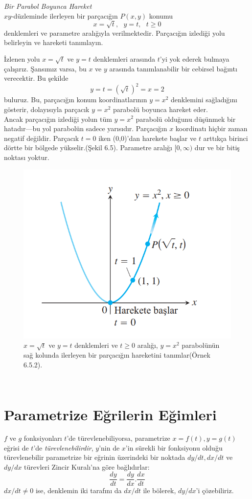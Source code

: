 \begin{ornek}\textit{Bir Parabol Boyunca Hareket}\\
$xy$-düzleminde ilerleyen bir parçacığın $P(x,y)$ konumu 
	\begin{equation*}
	x=\sqrt{t},\textit{       		}	y=t,	\textit{       		} t\geq0
	\end{equation*}
denklemleri ve parametre aralığıyla verilmektedir. Parçacığın izlediği yolu belirleyin ve hareketi tanımlayın.
\end{ornek}
\begin{cozum} İzlenen yolu $x =\sqrt{t}$ ve $y=t$ denklemleri arasında $t$'yi yok ederek bulmaya çalışırız. Şansımız varsa, bu $x$ ve $y$ arasında tanımlanabilir bir cebirsel bağıntı verecektir. Bu şekilde
	\begin{equation*}
	y=t=(\sqrt{t})^2=x=2
	\end{equation*}
buluruz. Bu, parçacığın konum koordinatlarının $y=x^2$ denklemini sağladığını gösterir, dolayısıyla parçacık $y=x^2$ parabolü boyunca hareket eder.\\
	Ancak parçacığın izlediği yolun tüm $y=x^2$ parabolü olduğunu düşünmek bir hatadır---bu yol parabolün sadece yarısıdır. Parçacığın $x$ koordinatı hiçbir zaman negatif değildir. Parçacık $t=0$ iken (0,0)'dan harekete başlar ve $t$ arttıkça birinci dörtte bir bölgede yükselir.(Şekil 6.5). Parametre aralığı $[0,\infty)$ dur ve bir bitiş noktası yoktur.
\begin{figure}[H]
	\centering
	\includegraphics[width=0.4\linewidth]{parametrik3.png}
	\caption{$x=\sqrt{t}$ ve $y=t$ denklemleri ve $ t\geq0$ aralığı, $y=x^2$ parabolünün sağ kolunda ilerleyen bir parçacığın hareketini tanımlar(Örnek 6.5.2).}
	\label{fig:ornekresim}
\end{figure}
\end{cozum}\\


\section{\protect Parametrize Eğrilerin Eğimleri } \label{bolumetiketi}
$f$ ve $g$ fonksiyonları $t$'de türevlenebiliyorsa, parametrize $x=f(t), y=g(t)$ eğrisi de $t$'de \textit{türevlenebilirdir}, $y$'nin de $x$'in sürekli bir fonksiyonu olduğu türevlenebilir parametrize bir eğrinin üzerindeki bir noktada $dy/dt, dx/dt$ ve $dy/dx$ türevleri Zincir Kuralı'na göre bağlıdırlar:
	\begin{equation*}
	\frac{dy}{dt}=\frac{dy}{dx}.\frac{dx}{dt}
	\end{equation*}
$dx/dt \ne 0$ ise, denklemin iki tarafını da $dx/dt$ ile bölerek, $dy/dx$'i çözebiliriz.\\
